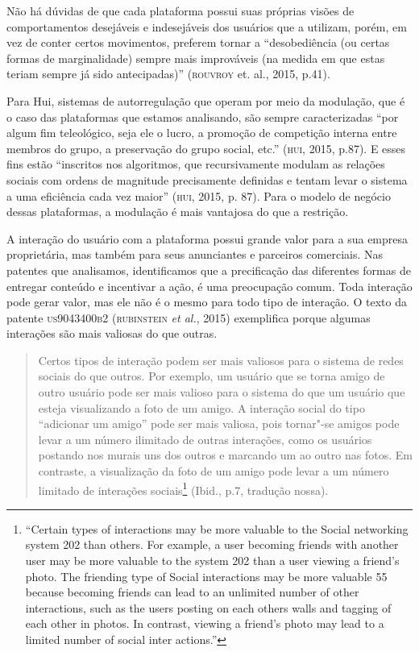 Não há dúvidas de que cada plataforma possui suas próprias visões de
comportamentos desejáveis e indesejáveis dos usuários que a utilizam,
porém, em vez de conter certos movimentos, preferem tornar a
``desobediência (ou certas formas de marginalidade) sempre mais
improváveis (na medida em que estas teriam sempre já sido antecipadas)''
(\textsc{rouvroy} et. al., 2015, p.41).

Para Hui, sistemas de autorregulação que operam por meio da modulação,
que é o caso das plataformas que estamos analisando, são sempre
caracterizadas ``por algum fim teleológico, seja ele o lucro, a promoção
de competição interna entre membros do grupo, a preservação do grupo
social, etc.'' (\textsc{hui}, 2015, p.87). E esses fins estão ``inscritos nos
algoritmos, que recursivamente modulam as relações sociais com ordens de
magnitude precisamente definidas e tentam levar o sistema a uma
eficiência cada vez maior'' (\textsc{hui}, 2015, p. 87). Para o modelo de negócio
dessas plataformas, a modulação é mais vantajosa do que a restrição.

A interação do usuário com a plataforma possui grande valor para a sua
empresa proprietária, mas também para seus anunciantes e parceiros
comerciais. Nas patentes que analisamos, identificamos que a
precificação das diferentes formas de entregar conteúdo e incentivar a
ação, é uma preocupação comum. Toda interação pode gerar valor, mas ele
não é o mesmo para todo tipo de interação. O texto da patente
\textsc{us9043400b2} (\textsc{rubinstein} \emph{et al.}, 2015) exemplifica porque algumas
interações são mais valiosas do que outras.

\begin{quote}
Certos tipos de interação podem ser mais valiosos para o sistema de
redes sociais do que outros. Por exemplo, um usuário que se torna amigo
de outro usuário pode ser mais valioso para o sistema do que um usuário
que esteja visualizando a foto de um amigo. A interação social do tipo
``adicionar um amigo'' pode ser mais valiosa, pois tornar"-se amigos pode
levar a um número ilimitado de outras interações, como os usuários
postando nos murais uns dos outros e marcando um ao outro nas fotos. Em
contraste, a visualização da foto de um amigo pode levar a um número
limitado de interações sociais\footnote{``Certain types of interactions
  may be more valuable to the Social networking system 202 than others.
  For example, a user becoming friends with another user may be more
  valuable to the system 202 than a user viewing a friend's photo. The
  friending type of Social interactions may be more valuable 55 because
  becoming friends can lead to an unlimited number of other
  interactions, such as the users posting on each others walls and
  tagging of each other in photos. In contrast, viewing a friend's photo
  may lead to a limited number of social inter actions.''} (Ibid., p.7,
tradução nossa).
\end{quote}

